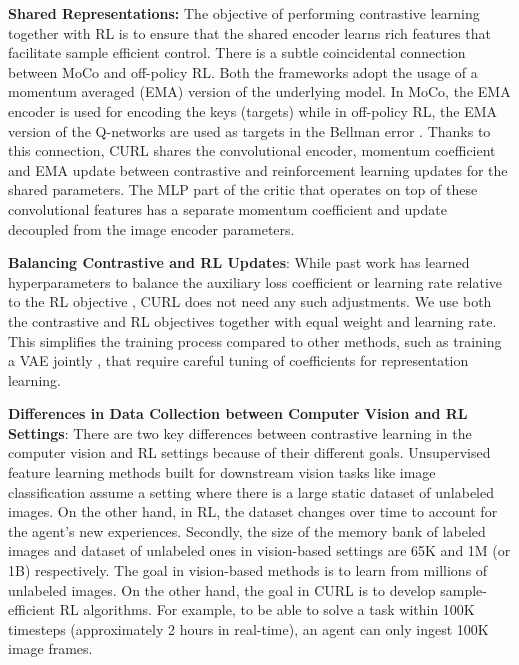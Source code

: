 \documentclass{article}
\begin{document}
{\textbf{Shared Representations:}}  
The objective of performing contrastive learning together with RL is to ensure that the shared encoder learns rich features that facilitate sample efficient control. There is a subtle coincidental connection between MoCo and off-policy RL. Both the frameworks adopt the usage of a momentum averaged (EMA) version of the underlying model. In MoCo, the EMA encoder is used for encoding the keys (targets) while in off-policy RL, the EMA version of the Q-networks are used as targets in the Bellman error \cite{mnih2015human, haarnoja2018soft}. Thanks to this connection, CURL shares the convolutional encoder, momentum coefficient and EMA update between contrastive and reinforcement learning updates for the shared parameters. The MLP part of the critic that operates on top of these convolutional features has a separate momentum coefficient and update decoupled from the image encoder parameters.

{\textbf{Balancing Contrastive and RL Updates}:}
While past work has learned hyperparameters to balance the auxiliary loss coefficient or learning rate relative to the RL objective \cite{jaderberg2016reinforcement, yarats2019improving}, CURL does not need any such adjustments. We use both the contrastive and RL objectives together with equal weight and learning rate. This simplifies the training process compared to other methods, such as training a VAE jointly \cite{hafner2018learning,hafner2019dream,lee2019stochastic}, that require careful tuning of coefficients for representation learning.


{\textbf{Differences in Data Collection between Computer Vision and RL Settings}:} 
There are two key differences between contrastive learning in the computer vision and RL settings because of their different goals. Unsupervised feature learning methods built for downstream vision tasks like image classification assume a setting where there is a large static dataset of unlabeled images.  On the other hand, in RL, the dataset changes over time to account for the agent's new experiences. Secondly, the size of the memory bank of labeled images and dataset of unlabeled ones in vision-based settings are 65K and 1M (or 1B) respectively. The goal in vision-based methods is to learn from millions of unlabeled images. On the other hand, the goal in CURL is to develop sample-efficient RL algorithms. For example, to be able to solve a task within 100K timesteps (approximately 2 hours in real-time), an agent can only ingest 100K image frames.
 
\end{document}
